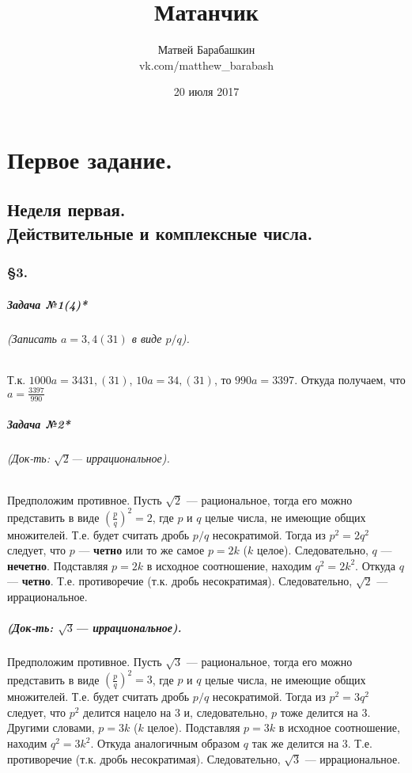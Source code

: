 \documentclass[a4paper,12pt]{report} %
\author{Матвей Барабашкин\\vk.com/matthew\_barabash}
\title{Матанчик}
\date{20 июля 2017}
\begin{document}

\maketitle

\chapter{Первое задание.}

\section{Неделя первая.\\ Действительные и комплексные числа.}

\subsection{\S3.\\}

\paragraph{Задача №1(4)*}
\subparagraph{(Записать $ a=3,4(31) $ в виде $ p/q $).}
Т.к. $ 1000a=3431,(31) $, $ 10a=34,(31) $, то 
$ 990a=3397 $. Откуда получаем, что $ a=\frac{3397}{990} $

\paragraph{Задача №2*}\label{sqrt2}
\subparagraph{(Док-ть: $ \sqrt{2} $--- иррациональное).}
Предположим противное.
Пусть $ \sqrt{2} $ --- рациональное, тогда
его можно представить в виде $ (\frac{p}{q})^2=2 $, где
$ p $ и $ q $ целые числа, не имеющие общих множителей.
Т.е. будет считать дробь $ p/q $ несократимой. Тогда
из $ p^2=2q^2 $ следует, что $ p $ --- \textbf{четно} или
то же самое $ p=2k $ ($ k $ целое). Следовательно,
$ q $ --- \textbf{нечетно}. 
Подставляя $ p=2k $ в исходное соотношение, находим
$ q^2=2k^2 $. Откуда $ q $ --- \textbf{четно}. 
Т.е. противоречие (т.к. дробь несократимая). Следовательно,
$ \sqrt{2} $ --- иррациональное.

\paragraph{(Док-ть: $ \sqrt{3} $--- иррациональное).}
Предположим противное.
Пусть $ \sqrt{3} $ --- рациональное, тогда
его можно представить в виде $ (\frac{p}{q})^2=3 $, где
$ p $ и $ q $ целые числа, не имеющие общих множителей.
Т.е. будет считать дробь $ p/q $ несократимой. Тогда
из $ p^2=3q^2 $ следует, что $ p^2 $ делится нацело на 3
и, следовательно, $ p $ тоже делится на 3.
Другими словами, $ p=3k $ ($ k $ целое).
Подставляя $ p=3k $ в исходное соотношение, находим
$ q^2=3k^2 $. Откуда аналогичным образом $ q $ так же делится на 3. 
Т.е. противоречие (т.к. дробь несократимая). Следовательно,
$ \sqrt{3} $ --- иррациональное.
\end{document}
